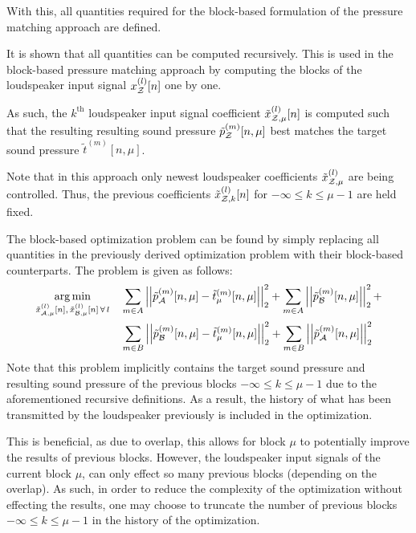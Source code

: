 With this, all quantities required for the block-based formulation of the pressure matching approach are defined.

It is shown that all quantities can be computed recursively.
This is used in the block-based pressure matching approach by computing the blocks of the loudspeaker input signal
$x_{\mathcal{Z}}^{(l)}[n]$ one by one. 

As such, the $k^\text{th}$ loudspeaker input signal coefficient $\tilde{x}^{(l)}_{\mathcal{Z},\mu}[n]$ is computed such 
that the resulting resulting sound pressure $\tilde{p}_{\mathcal{Z}}^{(m)}[n, \mu]$ best matches the target sound pressure 
$\tilde{t}^{(m)}[n, \mu]$. 

Note that in this approach only newest loudspeaker coefficients $\tilde{x}^{(l)}_{\mathcal{Z},\mu}$ are being controlled. 
Thus, the previous coefficients $\tilde{x}^{(l)}_{\mathcal{Z},k}[n]$ for $-\infty \leq k \leq \mu - 1$ are held fixed.

The block-based optimization problem can be found by simply replacing all quantities in the previously derived optimization problem
with their block-based counterparts.
The problem is given as follows:
\begin{align}
    \begin{aligned}
        \argmin{\tilde{x}_{\za,\mu}^{(l)}[n],\,\tilde{x}_{\zb,\mu}^{(l)}[n]\,\forall\,l}{
           &\sum_{m\in A} \norm[2][2]{\tilde{p}_{\za}^{(m)}[n,\mu] - \tilde{t}_\mu^{(m)}[n,\mu]} +
           \sum_{m\in A} \norm[2][2]{\tilde{p}_{\zb}^{(m)}[n,\mu]} + \\
           &\sum_{m\in B} \norm[2][2]{\tilde{p}_{\zb}^{(m)}[n,\mu] - \tilde{t}_\mu^{(m)}[n,\mu]} + 
           \sum_{m\in B} \norm[2][2]{\tilde{p}_{\za}^{(m)}[n,\mu]}
        }
    \end{aligned}
\end{align}
Note that this problem implicitly contains the target sound pressure and resulting sound pressure of the previous blocks $-\infty \leq k \leq \mu - 1$ due to
the aforementioned recursive definitions.
As a result, the history of what has been transmitted by the loudspeaker previously is included in the optimization.

This is beneficial, as due to overlap, this allows for block $\mu$ to potentially improve the results of previous blocks.
However, the loudspeaker input signals of the current block $\mu$, can only effect so many previous blocks (depending on the overlap).
As such, in order to reduce the complexity of the optimization without effecting the results, 
one may choose to truncate the number of previous blocks $-\infty \leq k \leq \mu - 1$ in the history of the optimization.

